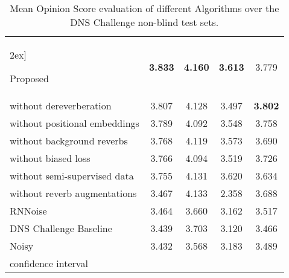 \documentclass[english]{article}
\begin{document}
\begin{table*}[hbt!]
\footnotesize
\centering
\begin{tabular}{lcccc} 
\hline \-2ex]

Proposed & \bf{3.833} & \bf{4.160} & \bf{3.613} & 3.779 \\
\hspace{0.07in} without dereverberation & 3.807 & 4.128 & 3.497 & \bf{3.802} \\
\hspace{0.07in}  without positional embeddings & 3.789 & 4.092 & 3.548 & 3.758 \\
\hspace{0.07in}  without background reverbs & 3.768 & 4.119 & 3.573 & 3.690 \\
\hspace{0.07in}  without biased loss & 3.766 & 4.094 & 3.519 & 3.726 \\
\hspace{0.07in}  without semi-supervised data & 3.755 & 4.131 & 3.620 & 3.634 \\
\hspace{0.07in}  without reverb augmentations & 3.467 & 4.133 & 2.358 & 3.688 \\
RNNoise \cite{valin2018rnnoise} & 3.464 & 3.660 & 3.162 & 3.517 \\
DNS Challenge Baseline \cite{dnschallenge} & 3.439 & 3.703 & 3.120 & 3.466 \\
Noisy & 3.432 & 3.568 & 3.183 & 3.489\\
\hline 
 confidence interval &  &  &  &  \\
\hline 
\end{tabular}
\vspace{0.05in}
\caption{Mean Opinion Score evaluation of different Algorithms over the DNS Challenge non-blind test sets. } 
\label{tablemos}
\end{table*}
\end{document}
